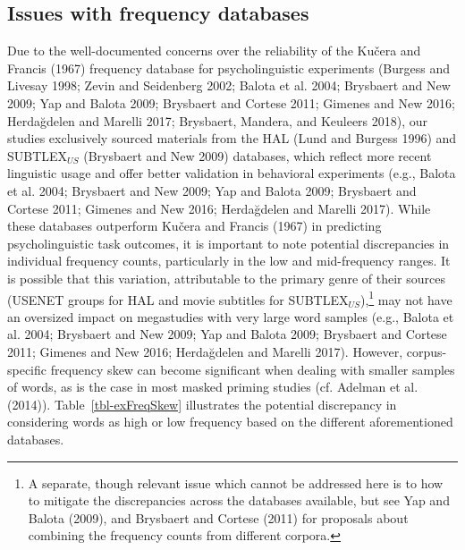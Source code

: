 \documentclass[
]{interact}
\begin{document}
\subsection{Issues with frequency databases}\label{sec-study-freq}

Due to the well-documented concerns over the reliability of the Kučera
and Francis (1967) frequency database for psycholinguistic experiments
(Burgess and Livesay 1998; Zevin and Seidenberg 2002; Balota et al.
2004; Brysbaert and New 2009; Yap and Balota 2009; Brysbaert and Cortese
2011; Gimenes and New 2016; Herdağdelen and Marelli 2017; Brysbaert,
Mandera, and Keuleers 2018), our studies exclusively sourced materials
from the HAL (Lund and Burgess 1996) and SUBTLEX\(_{US}\) (Brysbaert and
New 2009) databases, which reflect more recent linguistic usage and
offer better validation in behavioral experiments (e.g., Balota et al.
2004; Brysbaert and New 2009; Yap and Balota 2009; Brysbaert and Cortese
2011; Gimenes and New 2016; Herdağdelen and Marelli 2017). While these
databases outperform Kučera and Francis (1967) in predicting
psycholinguistic task outcomes, it is important to note potential
discrepancies in individual frequency counts, particularly in the low
and mid-frequency ranges. It is possible that this variation,
attributable to the primary genre of their sources (USENET groups for
HAL and movie subtitles for SUBTLEX\(_{US}\)),\footnote{A separate,
  though relevant issue which cannot be addressed here is to how to
  mitigate the discrepancies across the databases available, but see Yap
  and Balota (2009), and Brysbaert and Cortese (2011) for proposals
  about combining the frequency counts from different
  corpora.\label{fn-databases}} may not have an oversized impact on
megastudies with very large word samples (e.g., Balota et al. 2004;
Brysbaert and New 2009; Yap and Balota 2009; Brysbaert and Cortese 2011;
Gimenes and New 2016; Herdağdelen and Marelli 2017). However,
corpus-specific frequency skew can become significant when dealing with
smaller samples of words, as is the case in most masked priming studies
(cf. Adelman et al. (2014)). Table~\ref{tbl-exFreqSkew} illustrates the
potential discrepancy in considering words as high or low frequency
based on the different aforementioned databases.
\end{document}
